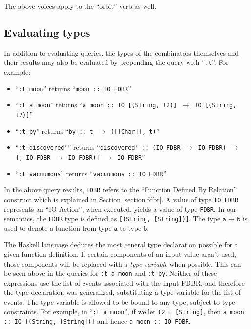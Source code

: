 \documentclass[../main.tex]{subfiles}
\begin{document}
\noindent The above voices apply to the ``orbit'' verb as well.

\subsection{Evaluating types}

In addition to evaluating queries, the types of the combinators themselves and their results may also be evaluated by prepending the query with
``\texttt{:t}''.  For example:

\begin{itemize}
	\item ``\texttt{:t moon}'' returns ``\texttt{moon :: IO FDBR}''
	\item ``\texttt{:t a moon}'' \subitem returns ``\texttt{a moon :: IO [(String,  t2)] $\rightarrow$ IO [(String,  t2)]}''
	\item ``\texttt{:t by}'' returns ``\texttt{by :: t $\rightarrow$ ([[Char]],  t)}''
	\item ``\texttt{:t discovered'}'' \subitem returns ``\texttt{discovered' :: (IO FDBR $\rightarrow$ IO FDBR) $\rightarrow$ \subsubitem [([[Char]],  IO FDBR $\rightarrow$ IO FDBR)] $\rightarrow$ IO FDBR}''
	\item ``\texttt{:t vacuumous}'' returns ``\texttt{vacuumous :: IO FDBR}''
\end{itemize}

In the above query results, \texttt{FDBR} refers to the ``Function Defined By Relation'' construct which is explained in Section \ref{section:fdbr}.  A value of type
\texttt{IO FDBR} represents an ``IO Action'', when executed, yields a value of type \texttt{FDBR}.  In our semantics, the \texttt{FDBR} type is defined as \texttt{[(String, [String])]}.
The type $\mathtt{a \rightarrow b}$ is used to denote a function from type $\mathtt{a}$ to type $\mathtt{b}$.

The Haskell language deduces the most general type declaration possible for a given function definition.  If certain components of an input value aren't used,
those components will be replaced with a {\em type variable} when possible.  This can be seen above in the queries for \texttt{:t a moon} and \texttt{:t by}.
Neither of these expressions use the list of events associated with the input FDBR, and therefore the type declaration was generalized,
substituting a type variable for the list of events.  The type variable is allowed to be bound to any type, subject to type constraints.
For example, in ``\texttt{:t a moon}'', if we let \texttt{t2 = [String]}, then \texttt{a moon :: IO [(String, [String])]} and hence \texttt {a moon :: IO FDBR}.
\end{document}
